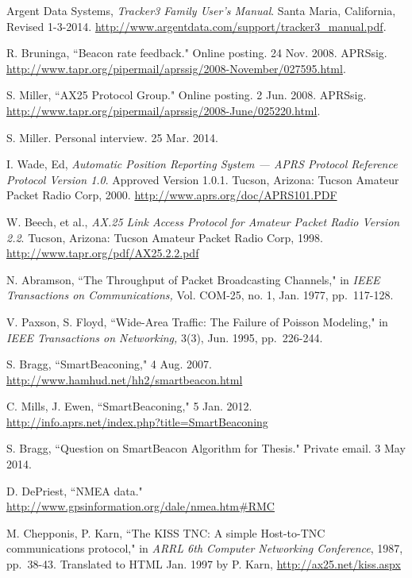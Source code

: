 \begin{thebibliography}{99}


		Argent Data Systems,
		\emph{Tracker3 Family User's Manual}.
		Santa Maria, California,
		Revised 1-3-2014.
		\url{http://www.argentdata.com/support/tracker3_manual.pdf}.

		R. Bruninga,
		``Beacon rate feedback."
		Online posting. 24 Nov. 2008. APRSsig.
		\url{http://www.tapr.org/pipermail/aprssig/2008-November/027595.html}.

		S. Miller,
		``AX25 Protocol Group."
		Online posting. 2 Jun. 2008. APRSsig.
		\url{http://www.tapr.org/pipermail/aprssig/2008-June/025220.html}.

		S. Miller. Personal interview. 25 Mar. 2014.

		I. Wade, Ed,
		\emph{Automatic Position Reporting System --- 
		APRS Protocol Reference Protocol Version 1.0}.
		Approved Version 1.0.1.
		Tucson, Arizona: Tucson Amateur Packet Radio Corp, 2000. 
		\url{http://www.aprs.org/doc/APRS101.PDF}

		W. Beech, et al.,
		\emph{AX.25 Link Access Protocol for Amateur Packet Radio Version 2.2}.
		Tucson, Arizona: Tucson Amateur Packet Radio Corp, 1998. 
		\url{http://www.tapr.org/pdf/AX25.2.2.pdf}

		N. Abramson,
		``The Throughput of Packet Broadcasting Channels," in
		\emph{IEEE Transactions on Communications,}
		Vol. COM-25, no. 1, Jan. 1977, pp.~117-128.

		V. Paxson, S. Floyd,
		``Wide-Area Traffic: The Failure of Poisson Modeling," in
		\emph{IEEE Transactions on Networking,}
		3(3), Jun. 1995, pp.~226-244.

		S. Bragg, 
		``SmartBeaconing\texttrademark,"
		4 Aug. 2007.
		\url{http://www.hamhud.net/hh2/smartbeacon.html}

		C. Mills, J. Ewen,
		``SmartBeaconing,"
		5 Jan. 2012.
		\url{http://info.aprs.net/index.php?title=SmartBeaconing}

		S. Bragg, ``Question on SmartBeacon Algorithm for Thesis."
		Private email. 3 May 2014.

		D. DePriest,
		``NMEA data."
		\url{http://www.gpsinformation.org/dale/nmea.htm#RMC}

		M. Chepponis, P. Karn,
		``The KISS TNC: A simple Host-to-TNC communications protocol,"
		in \emph{ARRL 6th Computer Networking Conference},
		1987, pp.~38-43.
		Translated to HTML Jan. 1997 by P. Karn,
		\url{http://ax25.net/kiss.aspx}


\end{thebibliography}
